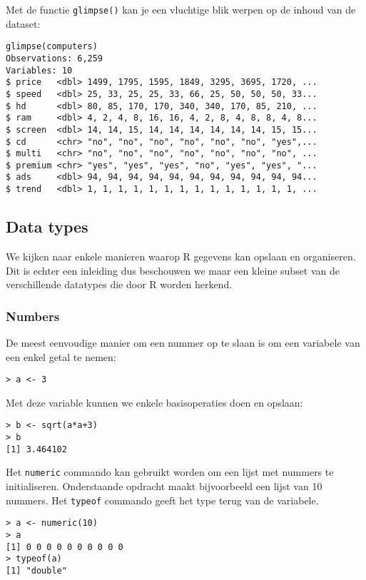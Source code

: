 Met de functie \texttt{glimpse()} kan je een vluchtige blik werpen op de inhoud van de dataset:

\begin{lstlisting}
glimpse(computers)
Observations: 6,259
Variables: 10
$ price   <dbl> 1499, 1795, 1595, 1849, 3295, 3695, 1720, ...
$ speed   <dbl> 25, 33, 25, 25, 33, 66, 25, 50, 50, 50, 33...
$ hd      <dbl> 80, 85, 170, 170, 340, 340, 170, 85, 210, ...
$ ram     <dbl> 4, 2, 4, 8, 16, 16, 4, 2, 8, 4, 8, 8, 4, 8...
$ screen  <dbl> 14, 14, 15, 14, 14, 14, 14, 14, 14, 15, 15...
$ cd      <chr> "no", "no", "no", "no", "no", "no", "yes",...
$ multi   <chr> "no", "no", "no", "no", "no", "no", "no", ...
$ premium <chr> "yes", "yes", "yes", "no", "yes", "yes", "...
$ ads     <dbl> 94, 94, 94, 94, 94, 94, 94, 94, 94, 94, 94...
$ trend   <dbl> 1, 1, 1, 1, 1, 1, 1, 1, 1, 1, 1, 1, 1, 1, ...
\end{lstlisting}

\subsection{Data types}

We kijken naar enkele manieren waarop R gegevens kan opslaan en organiseren. Dit is echter een inleiding dus beschouwen we maar een kleine subset van de verschillende datatypes die door R worden herkend.

\subsubsection{Numbers}

De meest eenvoudige manier om een nummer op te slaan is om een variabele van een enkel getal te nemen:

\begin{lstlisting}
> a <- 3
\end{lstlisting}

Met deze variable kunnen we enkele basisoperaties doen en opslaan:

\begin{lstlisting}
> b <- sqrt(a*a+3)
> b
[1] 3.464102
\end{lstlisting}

Het \texttt{numeric} commando kan gebruikt worden om een lijst met nummers te initialiseren. Onderstaande opdracht maakt bijvoorbeeld een lijst van 10 nummers. Het \texttt{typeof} commando geeft het type terug van de variabele.

\begin{lstlisting}
> a <- numeric(10)
> a
[1] 0 0 0 0 0 0 0 0 0 0
> typeof(a)
[1] "double"
\end{lstlisting}

